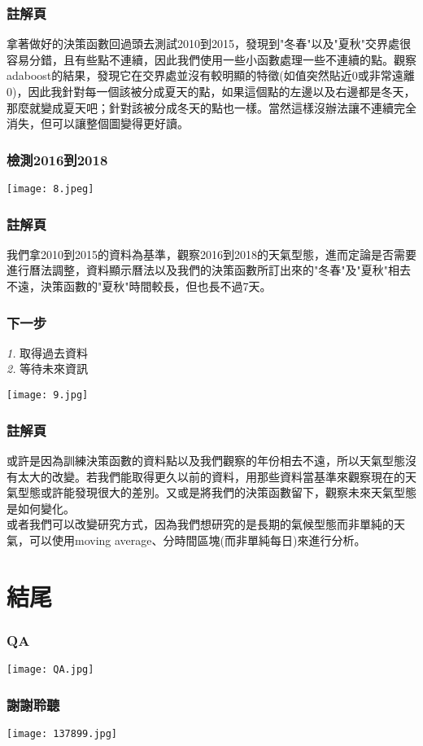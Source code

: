 \documentclass{beamer}
\begin{document}
\begin{frame}
\frametitle{註解頁}
\hspace*{4mm} 拿著做好的決策函數回過頭去測試2010到2015，發現到"冬春"以及"夏秋"交界處很容易分錯，且有些點不連續，因此我們使用一些小函數處理一些不連續的點。觀察adaboost的結果，發現它在交界處並沒有較明顯的特徵(如值突然貼近0或非常遠離0)，因此我針對每一個該被分成夏天的點，如果這個點的左邊以及右邊都是冬天，那麼就變成夏天吧；針對該被分成冬天的點也一樣。當然這樣沒辦法讓不連續完全消失，但可以讓整個圖變得更好讀。
\end{frame}
\begin{frame}
\frametitle{檢測2016到2018}
\begin{center}
\texttt{[image: 8.jpeg]}
\end{center}
\end{frame}
\begin{frame}
\frametitle{註解頁}
\hspace*{4mm} 我們拿2010到2015的資料為基準，觀察2016到2018的天氣型態，進而定論是否需要進行曆法調整，資料顯示曆法以及我們的決策函數所訂出來的"冬春"及"夏秋"相去不遠，決策函數的"夏秋"時間較長，但也長不過7天。
\end{frame}
\begin{frame}
\frametitle{下一步}
\emph{1. } 取得過去資料\\
\emph{2. } 等待未來資訊\\
\begin{center}
\texttt{[image: 9.jpg]}
\end{center}
\end{frame}
\begin{frame}
\frametitle{註解頁}
\hspace*{4mm} 或許是因為訓練決策函數的資料點以及我們觀察的年份相去不遠，所以天氣型態沒有太大的改變。若我們能取得更久以前的資料，用那些資料當基準來觀察現在的天氣型態或許能發現很大的差別。又或是將我們的決策函數留下，觀察未來天氣型態是如何變化。\\
\hspace*{4mm} 或者我們可以改變研究方式，因為我們想研究的是長期的氣候型態而非單純的天氣，可以使用moving average、分時間區塊(而非單純每日)來進行分析。
\end{frame}
\section{結尾}
\begin{frame}
\frametitle{QA}
\begin{center}
\texttt{[image: QA.jpg]}
\end{center}
\end{frame}
\begin{frame}
\frametitle{謝謝聆聽}
\begin{center}
\texttt{[image: 137899.jpg]}
\end{center}
\end{frame}
\end{document}
